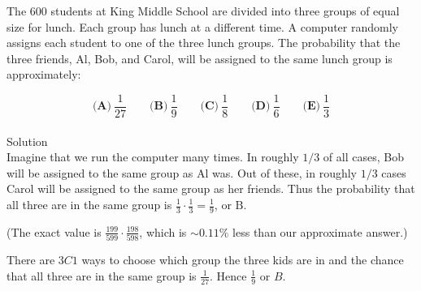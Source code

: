 

The $ 600$ students at King Middle School are divided into three groups of equal size for lunch. Each group has lunch at a different time. A computer randomly assigns each student to one of the three lunch groups. The probability that the three friends, Al, Bob, and Carol, will be assigned to the same lunch group is approximately:

\[ \textbf{(A)}\ \frac{1}{27} \qquad
\textbf{(B)}\ \frac{1}{9} \qquad
\textbf{(C)}\ \frac{1}{8} \qquad
\textbf{(D)}\ \frac{1}{6} \qquad
\textbf{(E)}\ \frac{1}{3}
\]
\\
Solution
\\
Imagine that we run the computer many times. In roughly $1/3$ of all cases, Bob will be assigned to the same group as Al was. Out of these, in roughly $1/3$ cases Carol will be assigned to the same group as her friends. Thus the probability that all three are in the same group is $\frac{1}{3}\cdot \frac{1}{3} = \frac{1}{9}$, or $\boxed{\text{B}}$.

(The exact value is $\frac{199}{599} \cdot \frac{198}{598}$, which is $\sim 0.11\%$ less than our approximate answer.)

There are $3C1$ ways to choose which group the three kids are in and the chance that all three are in the same group is $\frac{1}{27}$. Hence $\frac{1}{9}$ or $\boxed {B}$.